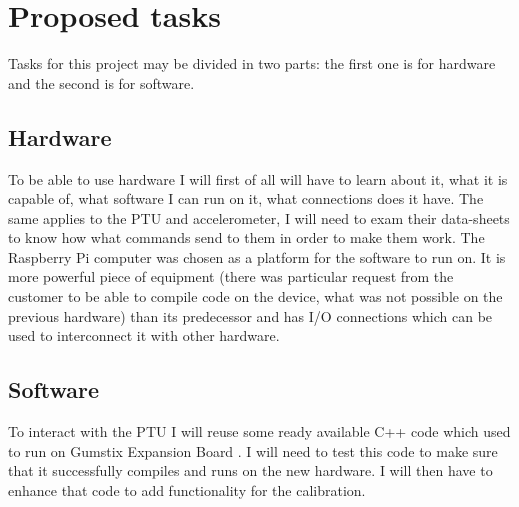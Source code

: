 \documentclass[11pt,fleqn,twoside]{article}
\begin{document}
\section{Proposed tasks}

Tasks for this project may be divided in two parts: the first one is for hardware and the second is for software. 

\subsection{Hardware}To be able to use hardware I will first of all will have to learn about it, what it is capable of, what software I can run on it, what connections does it have. The same applies to the PTU and accelerometer, I will need to exam their data-sheets to know how what commands send to them in order to make them work. The Raspberry Pi computer was chosen as a platform for the software to run on. It is more powerful piece of equipment (there was particular request from the customer to be able to compile code on the device, what was not possible on the previous hardware) than its predecessor and has I/O connections which can be used to interconnect it with other hardware. \cite{C_library_for_RPi} \cite{rpi_gpio}


\subsection{Software}
To interact with the PTU I will reuse some ready available C++ code which used to run on Gumstix Expansion Board \cite{gumstix_com}. I will need to test this code to make sure that it successfully compiles and runs on the new hardware. I will then have to enhance that code to add functionality for the calibration.
\end{document}
